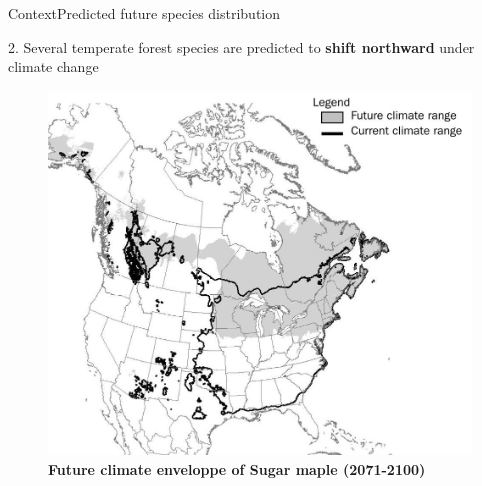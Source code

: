 \documentclass[10pt,aspectratio=149]{beamer}
\begin{document}
\begin{frame}[t]{Context}{Predicted future species distribution}

2. Several temperate forest species are predicted to \textbf{shift northward} under climate change

	\begin{figure}
		\includegraphics[width=.40\paperwidth]{Figs/sugar_map_distrib.jpg}
	\caption{ \textbf{Future climate enveloppe of Sugar maple (2071-2100)}}
	\end{figure}


\end{frame}


\end{document}
